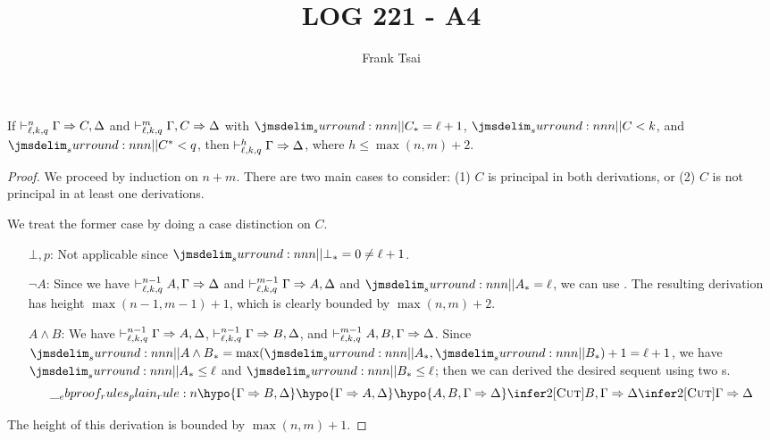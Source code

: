 \documentclass[a4paper]{article}
\title{LOG 221 - A4}
\author{Frank Tsai}
\begin{document}
\maketitle

\begin{lemma}
  If $\mathrel{\vdash^{n}_{\ell,k,q}} \Gamma \Rightarrow C,\Delta$ and $\mathrel{\vdash^{m}_{\ell,k,q}} \Gamma,C \Rightarrow \Delta$ with $\dRank{C} = \ell + 1$, $\cRank{C} < k$, and $\qRank{C} < q$, then $\mathrel{\vdash^{h}_{\ell,k,q}} \Gamma \Rightarrow \Delta$, where $h \leq \max(n,m) + 2$.
\end{lemma}
\begin{proof}
  We proceed by induction on $n + m$.
  There are two main cases to consider: (1) $C$ is principal in both derivations, or (2) $C$ is not principal in at least one derivations.

  We treat the former case by doing a case distinction on $C$.
  \begin{itemize}
  \item[$\bot,p$:] Not applicable since $\dRank{\bot} = 0 \neq \ell + 1$.
  \item[$\lnot A$:] Since we have $\mathrel{\vdash^{n-1}_{\ell,k,q}} A, \Gamma \Rightarrow \Delta$ and $\mathrel{\vdash^{m-1}_{\ell,k,q}} \Gamma \Rightarrow A, \Delta$ and $\dRank{A} = \ell$, we can use \rCut.
    The resulting derivation has height $\max(n-1,m-1) + 1$, which is clearly bounded by $\max(n,m) + 2$.
  \item[$A \wedge B$:] We have $\mathrel{\vdash^{n-1}_{\ell,k,q}} \Gamma \Rightarrow A, \Delta$, $\mathrel{\vdash^{n-1}_{\ell,k,q}} \Gamma \Rightarrow B, \Delta$, and $\mathrel{\vdash^{m-1}_{\ell,k,q}} A,B,\Gamma \Rightarrow \Delta$.
    Since $\dRank{A \wedge B} = \max(\dRank{A},\dRank{B}) + 1 = \ell + 1$, we have $\dRank{A} \leq \ell$ and $\dRank{B} \leq \ell$; then we can derived the desired sequent using two \rCut{}s.
    \[
      \ebrule{
        \hypo{\Gamma \Rightarrow B,\Delta}
        \hypo{\Gamma \Rightarrow A,\Delta}
        \hypo{A,B,\Gamma \Rightarrow \Delta}
        \infer2[\rCut]{B,\Gamma \Rightarrow \Delta}
        \infer2[\rCut]{\Gamma \Rightarrow \Delta}
      }
    \]
  \end{itemize}
  The height of this derivation is bounded by $\max(n,m) + 1$.
\end{proof}

% 
% 
\end{document}
